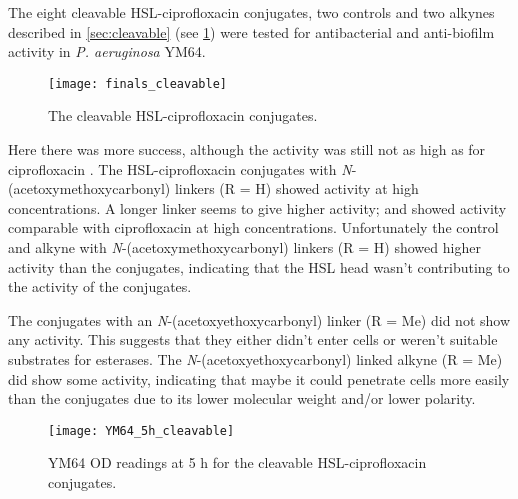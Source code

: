 The eight cleavable HSL-ciprofloxacin conjugates, two controls and two alkynes described in \ref{sec:cleavable} (see \ref{fgr:finals_cleavable}) were tested for antibacterial and anti-biofilm activity in \textit{P. aeruginosa} YM64. 

\begin{figure}[H]
	\begin{center}
		\texttt{[image: finals\_cleavable]}
		\caption{The cleavable HSL-ciprofloxacin conjugates.
 		\label{fgr:finals_cleavable}}
	\end{center}
\end{figure}

Here there was more success, although the activity was still not as high as for ciprofloxacin .
The HSL-ciprofloxacin conjugates with \textit{N}-(acetoxymethoxycarbonyl) linkers (R = H) showed activity at high concentrations. A longer linker seems to give higher activity;  and  showed activity comparable with ciprofloxacin  at high concentrations.
Unfortunately the control  and alkyne  with \textit{N}-(acetoxymethoxycarbonyl) linkers (R = H) showed higher activity than the conjugates, indicating that the HSL head wasn't contributing to the activity of the conjugates.

The conjugates with an \textit{N}-(acetoxyethoxycarbonyl) linker (R = Me) did not show any activity. This suggests that they either didn't enter cells or weren't suitable substrates for esterases.
The \textit{N}-(acetoxyethoxycarbonyl) linked alkyne (R = Me) did show some activity, indicating that maybe it could penetrate cells more easily than the conjugates due to its lower molecular weight and/or lower polarity.

\begin{figure}[H]
	\begin{center}
		\texttt{[image: YM64\_5h\_cleavable]}
		\caption{YM64 OD readings at 5 h for the cleavable HSL-ciprofloxacin conjugates.\label{fgr:YM64_5h_cleavable}}
	\end{center}
\end{figure}
